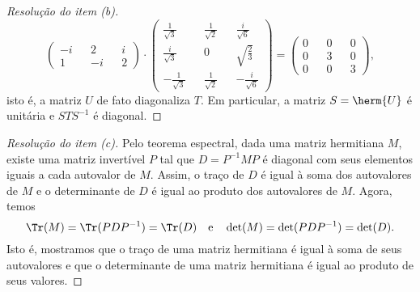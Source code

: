 \begin{proof}[Resolução do item (b)]
\begin{equation*}
\begin{pmatrix}
            -i&& 2 && i\\
            1 &&-i && 2
        \end{pmatrix}
        \cdot
        \begin{pmatrix}
            \frac{1}{\sqrt{3}} && \frac{1}{\sqrt{2}} && \frac{i}{\sqrt{6}}\\
            \frac{i}{\sqrt{3}} && 0 && \sqrt{\frac23}\\
            -\frac{1}{\sqrt{3}}&& \frac{1}{\sqrt{2}} && -\frac{i}{\sqrt{6}}
        \end{pmatrix}
        =
        \begin{pmatrix}
            0 && 0 && 0\\
            0 && 3 && 0\\
            0 && 0 && 3
        \end{pmatrix},
    \end{equation*}
    isto é, a matriz \(U\) de fato diagonaliza \(T\). Em particular, a matriz \(S = \herm{U}\) é unitária e \(STS^{-1}\) é diagonal.
\end{proof}
\begin{proof}[Resolução do item (c)]
    Pelo teorema espectral, dada uma matriz hermitiana \(M\), existe uma matriz invertível \(P\) tal que \(D = P^{-1}MP\) é diagonal com seus elementos iguais a cada autovalor de \(M\). Assim, o traço de \(D\) é igual à soma dos autovalores de \(M\) e o determinante de \(D\) é igual ao produto dos autovalores de \(M\). Agora, temos
    \begin{equation*}
        \Tr(M) = \Tr(PDP^{-1}) = \Tr(D)\quad\text{e}\quad\det(M) = \det(PDP^{-1}) = \det(D).
    \end{equation*}
    Isto é, mostramos que o traço de uma matriz hermitiana é igual à soma de seus autovalores e que o determinante de uma matriz hermitiana é igual ao produto de seus valores.
\end{proof}
